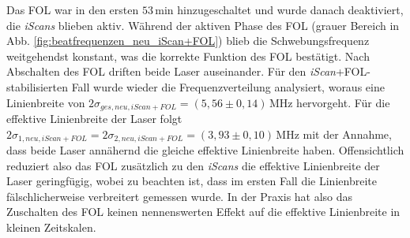 Das FOL war in den ersten $53\,$min hinzugeschaltet und wurde danach
deaktiviert, die \textit{iScans} blieben aktiv. Während der aktiven Phase des
FOL (grauer Bereich in Abb.
\ref{fig:beatfrequenzen_neu_iScan+FOL})
blieb die Schwebungsfrequenz weitgehendst konstant, was die korrekte Funktion des FOL bestätigt. Nach
Abschalten des FOL driften beide Laser auseinander. Für den
\textit{iScan}+FOL-stabilisierten Fall wurde wieder die Frequenzverteilung
analysiert, woraus eine Linienbreite von
$2\sigma_{ges,neu,iScan+FOL}=(5,56\pm0,14)\,$MHz hervorgeht. Für die effektive
Linienbreite der Laser folgt
$2\sigma_{1,neu,iScan+FOL}=2\sigma_{2,neu,iScan+FOL}=(3,93\pm0,10)\,$MHz mit
der Annahme, dass beide Laser annähernd die gleiche effektive Linienbreite haben.
Offensichtlich reduziert also das FOL zusätzlich zu den \textit{iScans} die
effektive Linienbreite der Laser geringfügig, wobei zu beachten ist, dass im
ersten Fall die Linienbreite fälschlicherweise verbreitert gemessen wurde. In der
Praxis hat also das Zuschalten des FOL keinen nennenswerten Effekt auf die
effektive Linienbreite in kleinen Zeitskalen.

